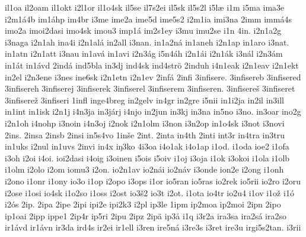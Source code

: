 {    il1oa
    il2oam
    il1okt
    i2l1or
    il1o4sk
    il5se
    il7s2ei
    il5sk
    il5s2l
    i5læ
    i1m
    i5ma
    ima3e
    i2m1á4b
    im1áhp
    im4br
    i3me
    ime2a
    ime5d
    ime5s2
    i2m1ia
    imi3na
    2imm
    immá4s
    imo2a
    imoi2dasi
    imo4sk
    imou3
    imp1á
    im2s1ey
    i3mu
    imu2se
    i1n
    4in.
    i2n1a2g
    i3naga
    i2n1ah
    ina4i
    i2n1alá
    in2all
    i3nan.
    in1a2ná
    in1aneh
    i2n1ap
    in1aro
    i3nat.
    in1atn
    i2n1att
    i3nau
    in1avá
    in1avi
    i2n3ág
    i5n4áh
    i2n1ái
    i2n1ák
    i3nál
    i2n3ám
    in1át
    in1ávd
    2indá
    ind5bla
    in3dj
    ind4sk
    ind4strö
    2induh
    i4n1eak
    i2n1eav
    i2n1ekt
    in2el
    i2n3ene
    i3nes
    ine6sk
    i2n1etn
    i2n1ev
    2infá
    2infi
    3infisere.
    3infisereb
    3infisered
    3infisereh
    3infiserej
    3infiserek
    3infiserel
    3infiserem
    3infiseren.
    3infisereš
    3infiseret
    3infiserež
    3infiseri
    1infl
    inge4breg
    in2gelv
    in4gr
    in2gre
    i5nii
    in1i2ja
    in2il
    in3ill
    in1int
    in1isk
    i2n1j
    i4n3ja
    in3járj
    i4njo
    in2jun
    in3kj
    in3na
    in5no
    i3no.
    in3oar
    ino2g
    i2n1oh
    i4nohp
    i3noin
    i4n3oj
    i2nok
    i2n1olm
    i3non
    i3n2op
    in1o4sk
    i3not
    i3novi
    2ins.
    2insa
    2insb
    2insi
    in5s4vo
    1inše
    2int.
    2inta
    in4th
    2inti
    int3r
    in4tra
    in3tru
    in1uks
    i2nul
    in1uvs
    2invi
    in4x
    iŋ3ko
    4i3oa
    i4o1ak
    i4o1ap
    i1od.
    i1oda
    ioe2
    i1ofa
    i3oh
    i2oi
    i4oi.
    ioi2dasi
    i4oig
    i3oinen
    i5ois
    i5oiv
    i1oj
    i3oja
    i1ok
    i3okoi
    i1ola
    i1olb
    i1olm
    i2olo
    i2om
    iomu3
    i2on.
    io2n1av
    io2nái
    io2náv
    i3onde
    ion2e
    i2ong
    i1onh
    i2ono
    i1onr
    i1ony
    io3o
    i1op
    i2opo
    i3ops
    i1or
    io5ran
    io5ras
    io2rek
    io5rii
    io2ro
    i2oru
    i2ose
    i1osi
    io4sk
    i1o2so
    i1oss
    i2ost
    io3š2
    io3t
    i2ot.
    i1ota
    io4tr
    io2u4
    i1ov
    i1ož
    i1ó
    i2ós
    2ip.
    2ipa
    2ipe
    2ipi
    ipi2e
    ipi2k3
    i2pl
    ip3le
    1ipm
    ip2moa
    ip2moi
    2ipn
    2ipo
    ip1oai
    2ipp
    ippe1
    2ip4r
    ip5ri
    2ipu
    2ipz
    2ipä
    ip3å
    i1q
    i3r2a
    ira3sa
    ira2sá
    ira2so
    ir1ávd
    ir1ávn
    ir3da
    ird4s
    ir2ei
    ir1ell
    i3ren
    ire5ná
    i3re3s
    i3ret
    ire3u
    irgi5s2tan.
    i3rii
}
